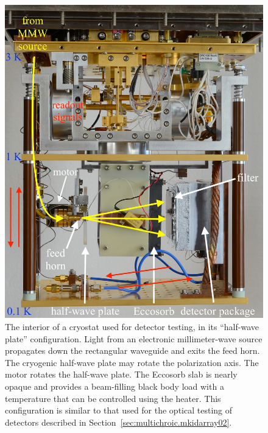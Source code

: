 \begin{figure}[htb]
\centering
\includegraphics[height=0.7\textheight]{hardware/starcryo_cryostat_with_hwp.jpg}
\caption[The interior of a cryostat used for detector testing, in its ``half-wave plate'' configuration.]
{
The interior of a cryostat used for detector testing, in its ``half-wave plate'' configuration.
Light from an electronic millimeter-wave source propagates down the rectangular waveguide and exits the feed horn.
The cryogenic half-wave plate may rotate the polarization axis.
The motor rotates the half-wave plate.
The Eccosorb slab is nearly opaque and provides a beam-filling black body load with a temperature that can be controlled using the heater.
This configuration is similar to that used for the optical testing of detectors described in Section~\ref{sec:multichroic.mkidarray02}.
}
\label{fig:starcryo_cryostat_with_hwp}
\end{figure}

